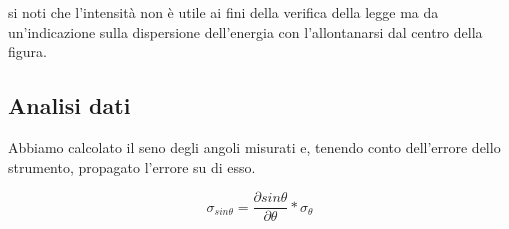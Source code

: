 \documentclass{article}
\theoremstyle{definition}
\begin{document}
\begin{figure}[!htbp]
    	\captionsetup{labelformat=empty}
    	
\end{figure}
si noti che l'intensità non è utile ai fini della verifica della legge ma da un'indicazione sulla dispersione dell'energia con l'allontanarsi dal centro della figura.


\subsection{Analisi dati}

Abbiamo calcolato il seno degli angoli misurati e, tenendo conto dell'errore dello strumento, propagato l'errore su di esso.



\[\sigma_{sin\theta} = \frac{\partial sin\theta}{\partial \theta}*\sigma_{\theta}\]



\begin{figure}[!htbp]
    	\captionsetup{labelformat=empty}
    	
\end{figure}
\end{document}
